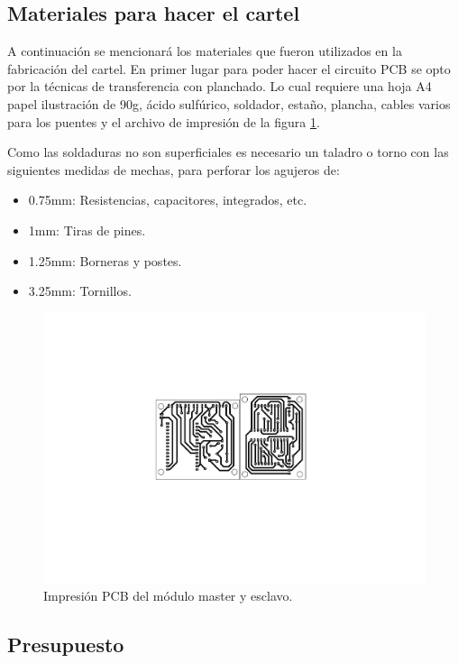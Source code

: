 \subsection{Materiales para hacer el cartel}\label{sec:materiales-para-hacer-cartel}

 A continuación se mencionará los materiales que fueron utilizados en la fabricación del cartel.
 En primer lugar para poder hacer el circuito PCB se opto por la técnicas de transferencia con planchado.
 Lo cual requiere una hoja A4 papel ilustración de 90g, ácido sulfúrico, soldador, estaño, plancha, cables varios para los puentes y el archivo de impresión de la figura \ref{fig:imp-pcb}.

 Como las soldaduras no son superficiales es necesario un taladro o torno con las siguientes medidas de mechas, para perforar los agujeros de:
 \begin{itemize}
     \item 0.75mm: Resistencias, capacitores, integrados, etc.
     \item 1mm: Tiras de pines.
     \item 1.25mm: Borneras y postes.
     \item 3.25mm: Tornillos.
 \end{itemize}

 \begin{figure}[ht!]
	\centering
	\includegraphics[width=\linewidth]{imagenes/hw/imp.pdf}
	\caption{Impresión PCB del módulo master y esclavo.}
	\label{fig:imp-pcb}
\end{figure}

\subsection{Presupuesto} \label{sec:presupuesto}

